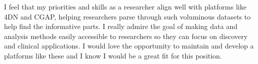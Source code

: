 \documentclass[11pt, a4paper]{./Awesome-CV/awesome-cv}
\begin{document}
\begin{cvletter}
I feel that my priorities and skills as a researcher align well with platforms like 4DN and CGAP, helping researchers parse through such voluminous datasets to help find the informative parts.
I really admire the goal of making data and analysis methods easily accessible to researchers so they can focus on discovery and clinical applications.
I would love the opportunity to maintain and develop a platforms like these and I know I would be a great fit for this position.

\end{cvletter}
\makeletterclosing
\end{document}
